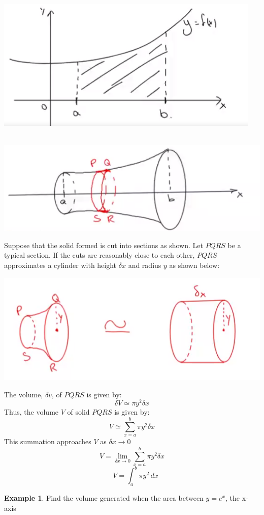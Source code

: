 \documentclass[12pt, a4paper]{report}
\theoremstyle{definition}
\newtheorem{example}{Example}
\begin{document}
	\begin{multicols}{2}
		\begin{center}
			\includegraphics[scale=0.5]{app_of_calc_integ_1}
		\end{center}
		\begin{center}
			~\\
			\includegraphics[scale=0.5]{app_of_calc_integ_2}
		\end{center}
	\end{multicols}
	
	
	Suppose that the solid formed is cut into sections as shown. Let $PQRS$ be a typical section. If the cuts are reasonably close to each other, $PQRS$ approximates a cylinder with height $\delta x$ and radius $y$ as shown below:
	\begin{center}
		\qquad \qquad \includegraphics[scale=1]{app_of_calc_integ_3}
	\end{center}
	The volume, $\delta v$, of $PQRS$ is given by:
	$$\delta V \simeq \pi y^2 \delta x$$
	Thus, the volume $V$ of solid $PQRS$ is given by:
	$$V\simeq \sum_{x=a}^{b} \pi y^2 \delta x$$
	This summation approaches $V$ as $\delta x \to 0$
	$$V = \lim\limits_{\delta x \to 0}   \sum_{x=a}^{b} \pi y^2 \delta x$$
	$$\quad\boxed{V = \int_{a}^{b} \pi y^2 \, dx}$$
	\hrulefill
	\begin{example}
		Find the volume generated when the area  between $y=e^x$, the x-axis
	\end{example}
	
\end{document}
